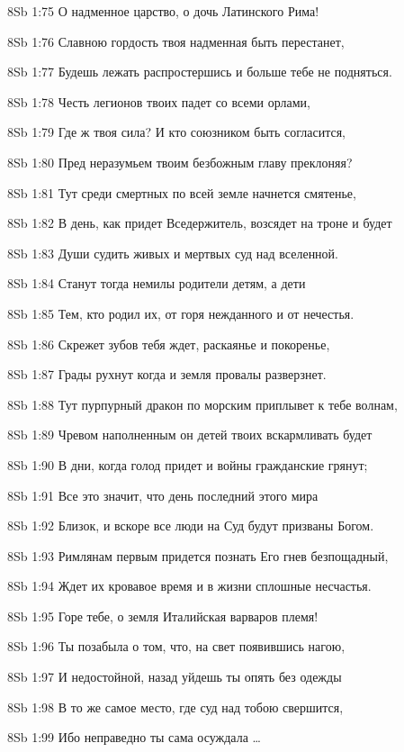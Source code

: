 \vs 8Sb 1:75 О надменное царство, о дочь Латинского Рима! 

\vs 8Sb 1:76 Славною гордость твоя надменная быть перестанет, 

\vs 8Sb 1:77 Будешь лежать распростершись и больше тебе не подняться. 

\vs 8Sb 1:78 Честь легионов твоих падет со всеми орлами, 

\vs 8Sb 1:79 Где ж твоя сила? И кто союзником быть согласится,

\vs 8Sb 1:80 Пред неразумьем твоим безбожным главу преклоняя? 

\vs 8Sb 1:81 Тут среди смертных по всей земле начнется смятенье, 

\vs 8Sb 1:82 В день, как придет Вседержитель, возсядет на троне и будет 

\vs 8Sb 1:83 Души судить живых и мертвых  суд над вселенной. 

\vs 8Sb 1:84 Станут тогда немилы родители детям, а дети

\vs 8Sb 1:85 Тем, кто родил их, от горя нежданного и от нечестья. 

\vs 8Sb 1:86 Скрежет зубов тебя ждет, раскаянье и покоренье, 

\vs 8Sb 1:87 Грады рухнут когда и земля провалы разверзнет. 

\vs 8Sb 1:88 Тут пурпурный дракон по морским приплывет к тебе волнам, 

\vs 8Sb 1:89 Чревом наполненным он детей твоих вскармливать будет

\vs 8Sb 1:90 В дни, когда голод придет и войны гражданские грянут; 

\vs 8Sb 1:91 Все это значит, что день последний этого мира 

\vs 8Sb 1:92 Близок, и вскоре все люди на Суд будут призваны Богом. 

\vs 8Sb 1:93 Римлянам первым придется познать Его гнев безпощадный, 

\vs 8Sb 1:94 Ждет их кровавое время и в жизни сплошные несчастья.

\vs 8Sb 1:95 Горе тебе, о земля Италийская  варваров племя!  

\vs 8Sb 1:96 Ты позабыла о том, что, на свет появившись нагою, 

\vs 8Sb 1:97 И недостойной, назад уйдешь ты опять без одежды 

\vs 8Sb 1:98 В то же самое место, где суд над тобою свершится, 

\vs 8Sb 1:99 Ибо неправедно ты сама осуждала \ldots

